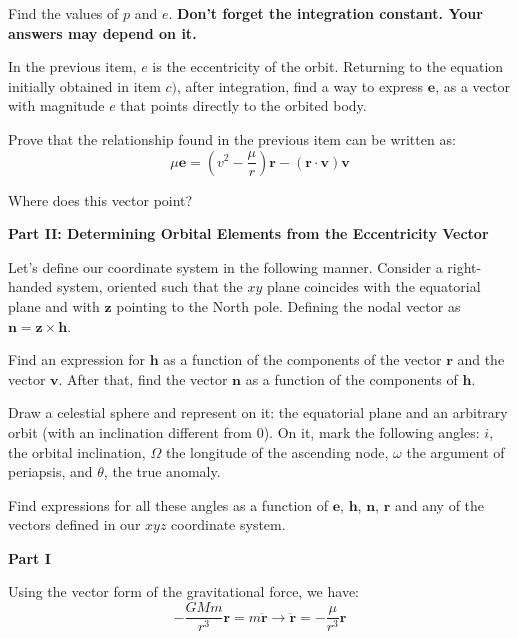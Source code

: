 \documentclass[11pt]{article}
\begin{document}
\begin{pproblem}
\begin{alternativas}
    Find the values of $p$ and $e$. \textbf{Don't forget the integration constant. Your answers may depend on it.}

    \item In the previous item, $e$ is the eccentricity of the orbit. Returning to the equation initially obtained in item $c)$, after integration, find a way to express $\mathbf{e}$, as a vector with magnitude $e$ that points directly to the orbited body.
    
    \item Prove that the relationship found in the previous item can be written as:
    \[\mu \mathbf{e} = (v^2-\frac{\mu}{r})\mathbf{r} - (\mathbf{r}\cdot\mathbf{v})\mathbf{v}\]

    Where does this vector point?
\end{alternativas}
\begin{center}
    \textbf{Part II: Determining Orbital Elements from the Eccentricity Vector}     
\end{center}
Let's define our coordinate system in the following manner. Consider a right-handed system, oriented such that the $xy$ plane coincides with the equatorial plane and with $\mathbf{z}$ pointing to the North pole. Defining the nodal vector as $\mathbf{n} = \mathbf{z} \times \mathbf{h}$.
\begin{alternativas}
    \item Find an expression for $\mathbf{h}$ as a function of the components of the vector $\mathbf{r}$ and the vector $\mathbf{v}$. After that, find the vector $\mathbf{n}$ as a function of the components of $\mathbf{h}$.

    \item Draw a celestial sphere and represent on it: the equatorial plane and an arbitrary orbit (with an inclination different from 0). On it, mark the following angles: $i$, the orbital inclination, $\Omega$ the longitude of the ascending node, $\omega$ the argument of periapsis, and $\theta$, the true anomaly. 

    \item Find expressions for all these angles as a function of $\mathbf{e}$, $\mathbf{h}$, $\mathbf{n}$, $\mathbf{r}$ and any of the vectors defined in our $xyz$ coordinate system.
\end{alternativas}

\begin{pssolution*}{}{}
    \begin{center}
        \textbf{Part I}
    \end{center}
    \begin{alternativas}
        \item Using the vector form of the gravitational force, we have:
        \[-\frac{GMm}{r^3}\mathbf{r} = m\ddot{\mathbf{r}} \rightarrow \boxed{\ddot{\mathbf{r}}= -\frac{\mu}{r^3}\mathbf{r}}\]


\end{alternativas}
\end{pssolution*}
\end{pproblem}
\end{document}
